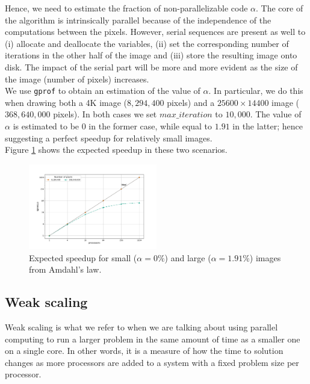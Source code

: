 \documentclass[11pt,a4paper]{article}
\newlength{\figureheight}
\newlength{\figurewidth}
\begin{document}
Hence, we need to estimate the fraction of non-parallelizable code $\alpha$.
The core of the algorithm is intrinsically parallel because of the independence of the computations between the pixels.
However, serial sequences are present as well to (i) allocate and deallocate the variables, (ii) set the corresponding number of iterations in the other half of the image and (iii) store the resulting image onto disk.
The impact of the serial part will be more and more evident as the size of the image (number of pixels) increases.\\
We use \texttt{gprof} to obtain an estimation of the value of $\alpha$.
In particular, we do this when drawing both a 4K image ($8,294,400$ pixels) and a $25600\times14400$ image ($368,640,000$ pixels).
In both cases we set $max\_iteration$ to $10,000$.
The value of $\alpha$ is estimated to be $0$ in the former case, while equal to $1.91$ in the latter; hence suggesting a perfect speedup for relatively small images.\\
Figure \ref{fig:exp-speedup} shows the expected speedup in these two scenarios.
\begin{figure}[H]
	\centering
	\includegraphics[width = 0.5\textwidth, clip, trim={1.5cm 1cm 2cm 2cm}]{expected-speedup.pdf}
	\caption{Expected speedup for small ($\alpha=0\%$) and large ($\alpha=1.91\%$) images from Amdahl's law.}
	\label{fig:exp-speedup}
\end{figure}

%	


\subsection{Weak scaling}
Weak scaling is what we refer to when we are talking about using parallel computing to run a larger problem in the same amount of time as a smaller one on a single core.
In other words, it is a measure of how the time to solution changes as more processors are added to a system with a fixed problem size per processor.\\[-7pt]
\end{document}
